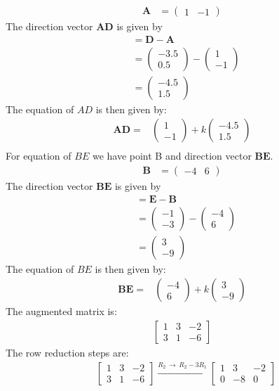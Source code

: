 \documentclass[journal,12pt,twocolumn]{IEEEtran}
\theoremstyle{remark}
\newcommand{\myvec}[1]{\begin{pmatrix}#1\end{pmatrix}}
\let\vec\mathbf
\begin{document}
\begin{align}
    \vec{A} &= \myvec{1 & -1}    
\end{align}
The direction vector $\vec{AD}$ is given by
\begin{align}
&= \vec{D} - \vec{A} \\
&= \myvec{-3.5 \\ 0.5} - \myvec{1 \\ -1} \\
&= \myvec{-4.5 \\ 1.5}
\end{align}
The equation of $AD$ is then given by:
\begin{align}
\text{} \vec{AD} = &\myvec{1\\-1} + k \myvec{-4.5\\1.5}\\
\end{align}
For equation of $BE$ we have point B and direction vector $\vec{BE}$.\begin{align}
    \vec{B} &= \myvec{-4 & 6}    
\end{align}
The direction vector $\vec{BE}$ is given by
\begin{align}
&= \vec{E} - \vec{B} \\
&= \myvec{-1 \\ -3} - \myvec{-4 \\ 6} \\
&= \myvec{3 \\ -9}
\end{align}The equation of $BE$ is then given by:
\begin{align}
\text{} \vec{BE} = &\myvec{-4\\6} + k \myvec{3\\-9}
\end{align}
The augmented matrix is:
\begin{align}
\begin{bmatrix}
1 & 3 & -2 \\
3 & 1 & -6
\end{bmatrix}
\end{align}
The row reduction steps are:\\ 
\begin{align}
&\begin{bmatrix}
1 & 3 & -2 \\
3 & 1 & -6
\end{bmatrix}
\xrightarrow{R_{2}\,\xrightarrow{}\,R_{2}-3R_{1}}
\begin{bmatrix}
1 & 3 & -2 \\
0 & -8 & 0
\end{bmatrix}
\end{align}
\end{document}
